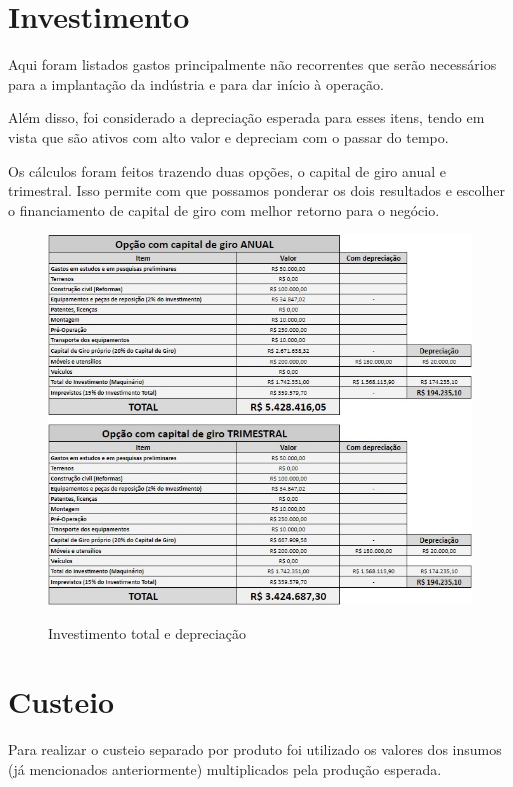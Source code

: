 \documentclass[
	12pt,				%
	openright,			%
	oneside,			%
	a4paper,			%
	english,			%
	french,				%
	spanish,			%
	brazil				%
	]{abntex2}
\begin{document}
\section{Investimento}

Aqui foram listados gastos principalmente não recorrentes que serão necessários para a implantação da indústria e para dar início à operação. 

Além disso, foi considerado a depreciação esperada para esses itens, tendo em vista que são ativos com alto valor e depreciam com o passar do tempo.

Os cálculos foram feitos trazendo duas opções, o capital de giro anual e trimestral. Isso permite com que possamos ponderar os dois resultados e escolher o financiamento de capital de giro com melhor retorno para o negócio.

\begin{figure}[H]
\begin{center}
\caption{Investimento total e depreciação}
\includegraphics[scale=0.7]{a1.jpeg} 
\label{-}
\end{center}
\end{figure}

\section{Custeio}

Para realizar o custeio separado por produto foi utilizado os valores dos insumos (já mencionados anteriormente) multiplicados pela produção esperada.
\end{document}

